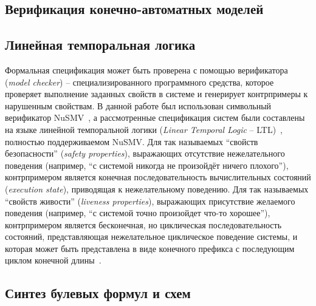 \subsection{Верификация конечно-автоматных моделей}
\label{sub:automata-verification}

\subsection{Линейная темпоральная логика}%
\label{sub:ltl}


Формальная спецификация может быть проверена с помощью верификатора (\emph{model checker}) \--- специализированного программного средства, которое проверяет выполнение заданных свойств в системе и генерирует контрпримеры к нарушенным свойствам.
В данной работе был использован символьный верификатор NuSMV~\cite{NuSMV}, а рассмотренные спецификация систем были составлены на языке линейной темпоральной логики (\textit{Linear Temporal Logic} \--- LTL)~\cite{ltl}, полностью поддерживаемом NuSMV\@.
Для так называемых \enquote{свойств безопасности} (\textit{safety properties}), выражающих отсутствие нежелательного поведения (например, \enquote{с системой никогда не произойдёт ничего плохого}), контрпримером является конечная последовательность вычислительных состояний (\textit{execution state}), приводящая к нежелательному поведению.
Для так называемых \enquote{свойств живости} (\textit{liveness properties}), выражающих присутствие желаемого поведения (например, \enquote{с системой точно произойдет что-то хорошее}), контрпримером является бесконечная, но циклическая последовательность состояний, представляющая нежелательное циклическое поведение системы, и которая может быть представлена в виде конечного префикса с последующим циклом конечной длины~\cite{clarke1999}.



\subsection{Синтез булевых формул и схем}
\label{sub:circuits-synthesis}



